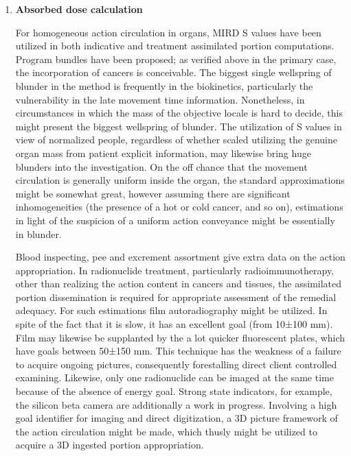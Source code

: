 \documentclass[12pt]{article}
\begin{document}
\begin{enumerate}
\begin{enumerate}
	\end{enumerate}
\item \textbf{Absorbed dose calculation} \par For homogeneous action circulation in organs, MIRD S values have been utilized in both indicative and treatment
assimilated portion computations. Program bundles have been proposed; as verified above in the primary case, the incorporation of cancers is conceivable. The biggest single wellspring of blunder in the method is frequently in the biokinetics, particularly the vulnerability in the late movement time information. Nonetheless, in circumstances in which the mass of the objective locale is hard to decide, this might present the biggest wellspring of blunder. The utilization of S values in view of normalized people, regardless of whether scaled utilizing the genuine organ mass from patient explicit information, may likewise bring huge blunders into the investigation. On the off chance that the movement circulation is generally uniform inside the organ, the standard approximations might be somewhat great, however assuming there are significant inhomogeneities (the presence of a hot or cold cancer, and so on), estimations in light of the suspicion of a uniform action conveyance might be essentially in blunder. \par
Blood inspecting, pee and excrement assortment give extra data on the action appropriation. In radionuclide treatment, particularly radioimmunotherapy, other than realizing the action content in cancers and tissues, the assimilated portion dissemination is required for appropriate assessment of the remedial adequacy. For such estimations film autoradiography might be utilized. In spite of the fact that it is slow, it has an excellent goal (from 10±100 mm). Film may likewise be supplanted by the a lot quicker fluorescent plates, which have goals between 50±150 mm. This technique has the weakness of a failure to acquire ongoing pictures, consequently forestalling direct client controlled examining. Likewise, only one radionuclide can be imaged at the same time because of the absence of energy goal. Strong state indicators, for example, the silicon beta camera are additionally a work in progress. Involving a high goal identifier for imaging and direct digitization, a 3D picture framework of the action circulation might be made, which thusly might be utilized to acquire a 3D ingested portion appropriation.


\end{enumerate}
\end{document}
